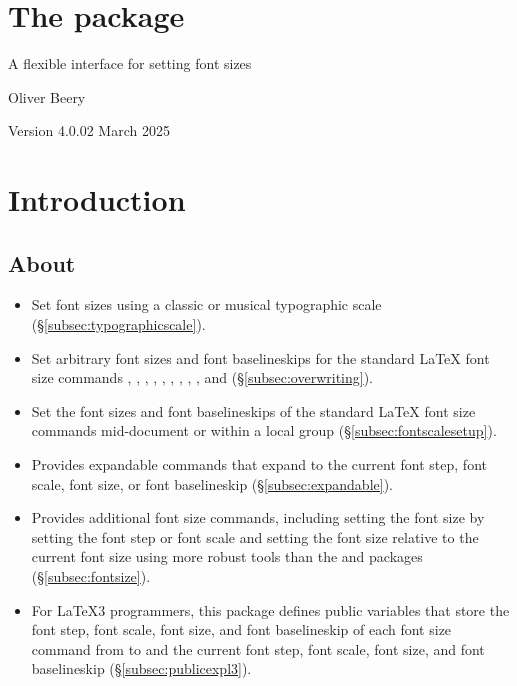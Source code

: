\documentclass{beery}
\begin{document}
\section*
  {%
    The  package%
  }

A flexible interface for setting font sizes

Oliver Beery

Version 4.0.0\quad{}2 March 2025


\section{Introduction}
\label{sec:intro}

\subsection{About}
\label{subsec:about}

\begin{itemize}
  \item
  Set font sizes using a classic or musical typographic scale (\S\ref{subsec:typographicscale}).
  \item
  Set arbitrary font sizes and font baselineskips for the standard \LaTeX{} font size commands , , , , , , , , , and  (\S\ref{subsec:overwriting}).
  \item
  Set the font sizes and font baselineskips of the standard \LaTeX{} font size commands mid-document or within a local group (\S\ref{subsec:fontscalesetup}).
  \item
  Provides expandable commands that expand to the current font step, font scale, font size, or font baselineskip (\S\ref{subsec:expandable}).
  \item
  Provides additional font size commands, including setting the font size by setting the font step or font scale and setting the font size relative to the current font size using more robust tools than the  and  packages (\S\ref{subsec:fontsize}).
  \item
  For \LaTeX3 programmers, this package defines public  variables that store the font step, font scale, font size, and font baselineskip of each font size command from  to  and the current font step, font scale, font size, and font baselineskip (\S\ref{subsec:publicexpl3}).
\end{itemize}
\end{document}

